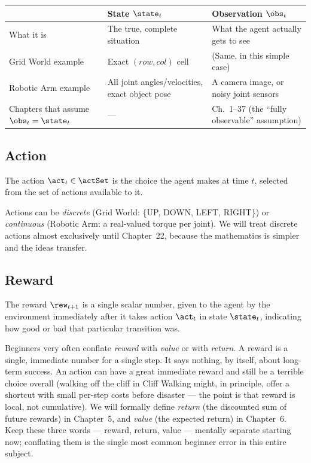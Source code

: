 \begin{center}
\begin{tabular}{@{}p{4.2cm}p{4.2cm}p{4.6cm}@{}}
\toprule
& \textbf{State $\state_t$} & \textbf{Observation $\obs_t$} \\
\midrule
What it is & The true, complete situation & What the agent actually gets to see \\
Grid World example & Exact $(row, col)$ cell & (Same, in this simple case) \\
Robotic Arm example & All joint angles/velocities, exact object pose & A camera image, or noisy joint sensors \\
Chapters that assume $\obs_t = \state_t$ & — & Ch.~1–37 (the ``fully observable'' assumption) \\
\bottomrule
\end{tabular}
\end{center}

\subsection*{Action}
\begin{definition}
The action $\act_t \in \actSet$ is the choice the agent makes at time $t$,
selected from the set of actions available to it.
\end{definition}
Actions can be \emph{discrete} (Grid World: \{UP, DOWN, LEFT, RIGHT\}) or
\emph{continuous} (Robotic Arm: a real-valued torque per joint). We will
treat discrete actions almost exclusively until Chapter~22, because the
mathematics is simpler and the ideas transfer.

\subsection*{Reward}
\begin{definition}
The reward $\rew_{t+1}$ is a single scalar number, given to the agent by
the environment immediately after it takes action $\act_t$ in state
$\state_t$, indicating how good or bad that particular transition was.
\end{definition}

\begin{commonmistakes}
Beginners very often conflate \emph{reward} with \emph{value} or with
\emph{return}. A reward is a single, immediate number for a single step.
It says nothing, by itself, about long-term success. An action can have a
great immediate reward and still be a terrible choice overall (walking
off the cliff in Cliff Walking might, in principle, offer a shortcut with
small per-step costs before disaster — the point is that reward is local,
not cumulative). We will formally define \emph{return} (the discounted
sum of future rewards) in Chapter~5, and \emph{value} (the expected
return) in Chapter~6. Keep these three words — reward, return, value —
mentally separate starting now; conflating them is the single most common
beginner error in this entire subject.
\end{commonmistakes}

